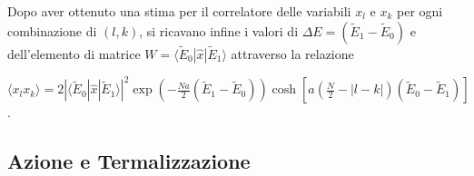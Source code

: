 Dopo aver ottenuto una stima per il correlatore delle variabili $x_l$ e $x_k$ per ogni combinazione di $(l,k)$, si ricavano infine i valori di $\Delta E=(\tilde{E}_1-\tilde{E}_0)$ e dell'elemento di matrice $W=\langle\tilde{E}_0|\hat{x}|\tilde{E}_1\rangle$ attraverso la relazione
\begin{center}
\small
$\langle x_l x_k\rangle = 2|\langle\tilde{E}_0|\hat{x}|\tilde{E}_1\rangle|^2\exp\left(-\frac{Na}{2}(\tilde{E}_1-\tilde{E}_0)\right)\cosh\left[a\left(\frac{N}{2}-|l-k|\right)(\tilde{E}_0-\tilde{E}_1)\right]$.
\end{center}

\subsection{Azione e Termalizzazione}

